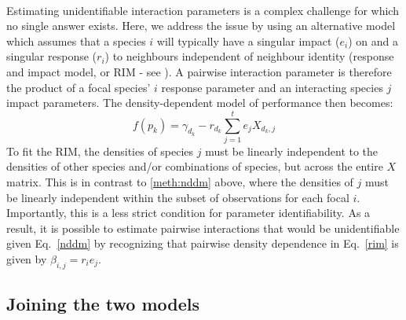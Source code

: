 \documentclass[a4,12pt]{article}
\begin{document}
    \paragraph{}
    Estimating unidentifiable interaction parameters is a complex challenge for which no single answer exists. Here, we address the issue by using an alternative model which assumes that a species $i$ will typically have a singular impact ($e_i$) on and a singular response ($r_i$) to neighbours independent of neighbour identity (response and impact model, or RIM - see \cite{Godoy2014b}). A pairwise interaction parameter is therefore the product of a focal species' $i$ response parameter and an interacting species $j$ impact parameters. The density-dependent model of performance then becomes:
        \begin{equation}
        f(p_{k}) = \gamma_{d_k} - r_{d_k} \sum_{j=1}^{t} e_{j} X_{d_k, j}
        \label{rim}
        \end{equation}
    To fit the RIM, the densities of species $j$ must be linearly independent to the densities of other species and/or combinations of species, but across the entire $X$ matrix. This is in contrast to \ref{meth:nddm} above, where the densities of $j$ must be linearly independent within the subset of observations for each focal $i$. Importantly, this is a less strict condition for parameter identifiability. As a result, it is possible to estimate pairwise interactions that would be unidentifiable given Eq.~\ref{nddm} by recognizing that pairwise density dependence in Eq.~\ref{rim} is given by $\beta_{i, j} = r_{i} e_{j}$.


    \subsection{Joining the two models}
    \label{meth:addlog}
\end{document}
